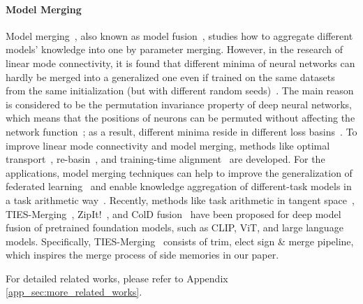 \documentclass{article}
\begin{document}
\paragraph{Model Merging}
Model merging~\cite{mergekit}, also known as model fusion~\cite{deep_model_fusion_survey,otfusion}, studies how to aggregate different models' knowledge into one by parameter merging. However, in the research of linear mode connectivity, it is found that different minima of neural networks can hardly be merged into a generalized one even if trained on the same datasets from the same initialization (but with different random seeds)~\cite{perm_role_lmc,git_rebasin}. The main reason is considered to be the permutation invariance property of deep neural networks, which means that the positions of neurons can be permuted without affecting the network function~\cite{perm_role_lmc}; as a result, different minima reside in different loss basins~\cite{git_rebasin}. To improve linear mode connectivity and model merging, methods like optimal transport~\cite{otfusion,formerotfusion}, re-basin~\cite{git_rebasin}, and training-time alignment~\cite{tna} are developed. For the applications, model merging techniques can help to improve the generalization of federated learning~\cite{fedlaw,fedma} and enable knowledge aggregation of different-task models in a task arithmetic way~\cite{task_arithmetic,task_arithmetic_tangent}. Recently, methods like task arithmetic in tangent space~\cite{task_arithmetic_tangent}, TIES-Merging~\cite{ties_merge}, ZipIt!~\cite{zipit}, and ColD fusion~\cite{cold_fusion} have been proposed for deep model fusion of pretrained foundation models, such as CLIP, ViT, and large language models. Specifically, TIES-Merging~\cite{ties_merge} consists of trim, elect sign \& merge pipeline, which inspires the merge process of side memories in our paper.


For detailed related works, please refer to Appendix \ref{app_sec:more_related_works}.
\end{document}
